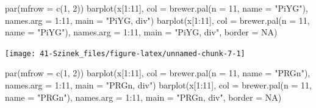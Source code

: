 \documentclass[
]{book}
\newenvironment{Shaded}{\begin{snugshade}}{\end{snugshade}}
\newcommand{\AttributeTok}[1]{\textcolor[rgb]{0.77,0.63,0.00}{#1}}
\newcommand{\ConstantTok}[1]{\textcolor[rgb]{0.00,0.00,0.00}{#1}}
\newcommand{\DecValTok}[1]{\textcolor[rgb]{0.00,0.00,0.81}{#1}}
\newcommand{\FunctionTok}[1]{\textcolor[rgb]{0.00,0.00,0.00}{#1}}
\newcommand{\NormalTok}[1]{#1}
\newcommand{\SpecialCharTok}[1]{\textcolor[rgb]{0.00,0.00,0.00}{#1}}
\newcommand{\StringTok}[1]{\textcolor[rgb]{0.31,0.60,0.02}{#1}}
\begin{document}
\begin{Shaded}
\begin{Highlighting}[]
\FunctionTok{par}\NormalTok{(}\AttributeTok{mfrow =} \FunctionTok{c}\NormalTok{(}\DecValTok{1}\NormalTok{, }\DecValTok{2}\NormalTok{))}
\FunctionTok{barplot}\NormalTok{(x[}\DecValTok{1}\SpecialCharTok{:}\DecValTok{11}\NormalTok{], }\AttributeTok{col =} \FunctionTok{brewer.pal}\NormalTok{(}\AttributeTok{n =} \DecValTok{11}\NormalTok{, }\AttributeTok{name =} \StringTok{"PiYG"}\NormalTok{), }\AttributeTok{names.arg =} \DecValTok{1}\SpecialCharTok{:}\DecValTok{11}\NormalTok{, }
    \AttributeTok{main =} \StringTok{"PiYG, div"}\NormalTok{)}
\FunctionTok{barplot}\NormalTok{(x[}\DecValTok{1}\SpecialCharTok{:}\DecValTok{11}\NormalTok{], }\AttributeTok{col =} \FunctionTok{brewer.pal}\NormalTok{(}\AttributeTok{n =} \DecValTok{11}\NormalTok{, }\AttributeTok{name =} \StringTok{"PiYG"}\NormalTok{), }\AttributeTok{names.arg =} \DecValTok{1}\SpecialCharTok{:}\DecValTok{11}\NormalTok{, }
    \AttributeTok{main =} \StringTok{"PiYG, div"}\NormalTok{, }\AttributeTok{border =} \ConstantTok{NA}\NormalTok{)}
\end{Highlighting}
\end{Shaded}

\begin{center}\texttt{[image: 41-Szinek\_files/figure-latex/unnamed-chunk-7-1]} \end{center}

\begin{Shaded}
\begin{Highlighting}[]
\FunctionTok{par}\NormalTok{(}\AttributeTok{mfrow =} \FunctionTok{c}\NormalTok{(}\DecValTok{1}\NormalTok{, }\DecValTok{2}\NormalTok{))}
\FunctionTok{barplot}\NormalTok{(x[}\DecValTok{1}\SpecialCharTok{:}\DecValTok{11}\NormalTok{], }\AttributeTok{col =} \FunctionTok{brewer.pal}\NormalTok{(}\AttributeTok{n =} \DecValTok{11}\NormalTok{, }\AttributeTok{name =} \StringTok{"PRGn"}\NormalTok{), }\AttributeTok{names.arg =} \DecValTok{1}\SpecialCharTok{:}\DecValTok{11}\NormalTok{, }
    \AttributeTok{main =} \StringTok{"PRGn, div"}\NormalTok{)}
\FunctionTok{barplot}\NormalTok{(x[}\DecValTok{1}\SpecialCharTok{:}\DecValTok{11}\NormalTok{], }\AttributeTok{col =} \FunctionTok{brewer.pal}\NormalTok{(}\AttributeTok{n =} \DecValTok{11}\NormalTok{, }\AttributeTok{name =} \StringTok{"PRGn"}\NormalTok{), }\AttributeTok{names.arg =} \DecValTok{1}\SpecialCharTok{:}\DecValTok{11}\NormalTok{, }
    \AttributeTok{main =} \StringTok{"PRGn, div"}\NormalTok{, }\AttributeTok{border =} \ConstantTok{NA}\NormalTok{)}
\end{Highlighting}
\end{Shaded}
\end{document}
